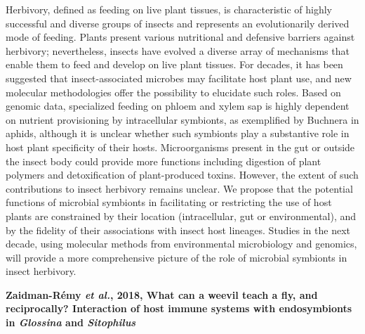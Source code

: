 \documentclass[11pt]{article}
\begin{document}
\begin{sloppypar}
Herbivory, defined as feeding on live plant tissues, is characteristic of highly successful and diverse groups of insects and represents an evolutionarily derived mode of feeding. Plants present various nutritional and defensive barriers against herbivory; nevertheless, insects have evolved a diverse array of mechanisms that enable them to feed and develop on live plant tissues. For decades, it has been suggested that insect-associated microbes may facilitate host plant use, and new molecular methodologies offer the possibility to elucidate such roles. Based on genomic data, specialized feeding on phloem and xylem sap is highly dependent on nutrient provisioning by intracellular symbionts, as exemplified by Buchnera in aphids, although it is unclear whether such symbionts play a substantive role in host plant specificity of their hosts. Microorganisms present in the gut or outside the insect body could provide more functions including digestion of plant polymers and detoxification of plant-produced toxins. However, the extent of such contributions to insect herbivory remains unclear. We propose that the potential functions of microbial symbionts in facilitating or restricting the use of host plants are constrained by their location (intracellular, gut or environmental), and by the fidelity of their associations with insect host lineages. Studies in the next decade, using molecular methods from environmental microbiology and genomics, will provide a more comprehensive picture of the role of microbial symbionts in insect herbivory.
\par
\textbf{Zaidman-Rémy \textit{et al.}, 2018, What can a weevil teach a fly, and reciprocally? Interaction of host immune systems with endosymbionts in \textit{Glossina} and \textit{Sitophilus}} \newline

\end{sloppypar}
\end{document}
